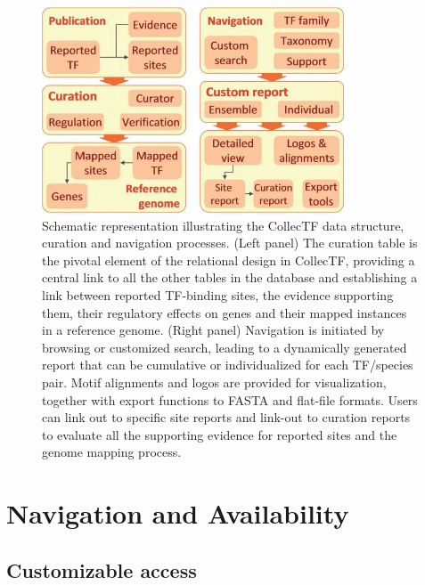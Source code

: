 \begin{figure}
  \centering
  \includegraphics[width=0.8\textwidth]{figures/chapter2/data-structure}
  \caption{Schematic representation illustrating the CollecTF data structure,
    curation and navigation processes. (Left panel) The curation table is the
    pivotal element of the relational design in CollecTF, providing a central
    link to all the other tables in the database and establishing a link
    between reported TF-binding sites, the evidence supporting them, their
    regulatory effects on genes and their mapped instances in a reference
    genome. (Right panel) Navigation is initiated by browsing or customized
    search, leading to a dynamically generated report that can be cumulative or
    individualized for each TF/species pair. Motif alignments and logos are
    provided for visualization, together with export functions to FASTA and
    flat-file formats. Users can link out to specific site reports and link-out
    to curation reports to evaluate all the supporting evidence for reported
    sites and the genome mapping process.}
\label{fig:data-structure}
\end{figure}

\section{Navigation and Availability}

\subsection{Customizable access}

